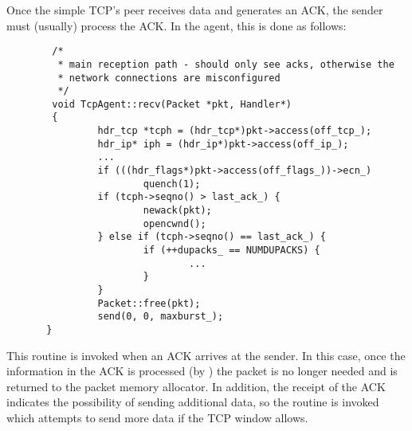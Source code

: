 Once the simple TCP's peer receives data and generates an ACK, the
sender must (usually) process the ACK.
In the  agent, this is done as follows:
\begin{small}
\begin{verbatim}
        /*
         * main reception path - should only see acks, otherwise the
         * network connections are misconfigured
         */
        void TcpAgent::recv(Packet *pkt, Handler*)
        {
                hdr_tcp *tcph = (hdr_tcp*)pkt->access(off_tcp_);
                hdr_ip* iph = (hdr_ip*)pkt->access(off_ip_);
                ...
                if (((hdr_flags*)pkt->access(off_flags_))->ecn_)
                        quench(1);
                if (tcph->seqno() > last_ack_) {
                        newack(pkt);
                        opencwnd();
                } else if (tcph->seqno() == last_ack_) {
                        if (++dupacks_ == NUMDUPACKS) {
                                ...
                        }
                }
                Packet::free(pkt);
                send(0, 0, maxburst_);
       }
\end{verbatim}
\end{small}
This routine is invoked when an ACK arrives at the sender.
In this case, once the information in the ACK is processed (by )
the packet is no longer needed and is returned to the packet memory
allocator.
In addition, the receipt of the ACK indicates the possibility of sending
additional data, so the  routine is
invoked which attempts to send more data if the TCP window allows.

\subsection{}

